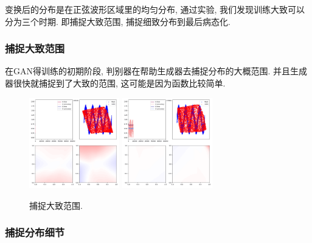 \documentclass[lang=cn,11pt]{elegantpaper}
\begin{document}
\noindent 变换后的分布是在正弦波形区域里的均匀分布, 通过实验, 我们发现训练大致可以分为三个时期. 即捕捉大致范围, 捕捉细致分布到最后病态化.

\subsubsection{捕捉大致范围}
在GAN得训练的初期阶段, 判别器在帮助生成器去捕捉分布的大概范围. 并且生成器很快就捕捉到了大致的范围, 这可能是因为函数比较简单.

\begin{figure}[htbp]
\centering
  \includegraphics[width=0.35\textwidth]{sin_2_1}
  \includegraphics[width=0.35\textwidth]{sin_2_2}
  \caption{捕捉大致范围.}
\end{figure}

\subsubsection{捕捉分布细节}
\end{document}
